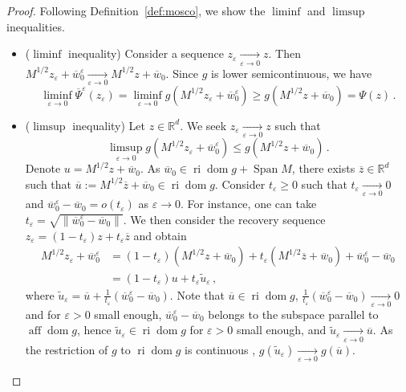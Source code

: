 \documentclass[11pt,english,reqno]{article}
\DeclareMathOperator{\Span}{Span}
\DeclareMathOperator{\dom}{dom}
\DeclareMathOperator{\ri}{ri}
\DeclareMathOperator{\aff}{aff}
\newcommand{\R}{\mathbb{R}}
\renewcommand{\leq}{\leqslant}
\renewcommand{\geq}{\geqslant}
\theoremstyle{plain}
\theoremstyle{definition}
\theoremstyle{remark}
\numberwithin{equation}{section}
\begin{document}
\begin{proof}
	Following Definition~\ref{def:mosco}, we show the $\liminf$ and $\limsup$ inequalities.
	\begin{itemize}
		\item ($\liminf$ inequality) Consider a sequence $z_\varepsilon \xrightarrow[\varepsilon\to 0]{} z$. Then $M^{1/2} z_\varepsilon + \overline{w}_0^\varepsilon \xrightarrow[\varepsilon\to 0]{} M^{1/2} z + \overline{w}_0$. Since $g$ is lower semicontinuous, we have
		\begin{equation*}
			\liminf_{\varepsilon \to 0} \overline{\Psi}^\varepsilon(z_\varepsilon) = \liminf_{\varepsilon \to 0} g(M^{1/2} z_\varepsilon + \overline{w}_0^\varepsilon) \geq g(M^{1/2} z + \overline{w}_0) = \Psi(z) \, .
		\end{equation*}
		\item ($\limsup$ inequality)
		Let $z \in \R^d$. We seek $z_\varepsilon \xrightarrow[\varepsilon\to0]{} z$ such that
		\begin{equation*}
			\limsup_{\varepsilon \to 0} g(M^{1/2} z_\varepsilon + \overline{w}_0^\varepsilon) \leq g(M^{1/2} z + \overline{w}_0) \, .
		\end{equation*}
		Denote $u = M^{1/2} z + \overline{w}_0$. As $\overline{w}_0 \in \ri \dom g + \Span M$, there exists $\overline{z} \in \R^d$ such that $\overline{u} := M^{1/2} \overline{z} + \overline{w}_0 \in \ri \dom g$. Consider $t_\varepsilon \geq 0$ such that $t_\varepsilon \xrightarrow[\varepsilon\to 0]{} 0$ and $\overline{w}_0^\varepsilon - \overline{w}_0 = o(t_\varepsilon)$ as $\varepsilon \to 0$. For instance, one can take $t_\varepsilon = \sqrt{\|\overline{w}_0^\varepsilon - \overline{w}_0\|}$. We then consider the recovery sequence $z_\varepsilon = (1-t_\varepsilon) z + t_\varepsilon \overline{z}$ and obtain
		\begin{align*}
			M^{1/2} z_\varepsilon + \overline{w}_0^\varepsilon &= (1-t_\varepsilon) (M^{1/2} z + \overline{w}_0) + t_\varepsilon (M^{1/2} \overline{z} + \overline{w}_0) + \overline{w}_0^\varepsilon - \overline{w}_0 \\
			&= (1-t_\varepsilon) u + t_\varepsilon \widetilde{u}_\varepsilon \, ,
		\end{align*} 
		where $\widetilde{u}_\varepsilon = \overline{u} + \frac{1}{t_\varepsilon}(\overline{w}_0^\varepsilon - \overline{w}_0)$. 
		Note that $\overline{u} \in \ri \dom g$, $\frac{1}{t_\varepsilon} (\overline{w}_0^\varepsilon - \overline{w}_0) \xrightarrow[\varepsilon\to 0]{} 0$ and for $\varepsilon > 0$ small enough, $\overline{w}_0^\varepsilon - \overline{w}_0$ belongs to the subspace parallel to $\aff \dom g$, hence $\widetilde{u}_\varepsilon \in \ri \dom g$ for $\varepsilon > 0$ small enough, and $\widetilde{u}_\varepsilon \xrightarrow[\varepsilon\to 0]{} \overline{u}$. As the restriction of $g$ to $\ri \dom g$ is continuous \cite[Thm.~10.1]{rockafellar1970convex}, $g(\widetilde{u}_\varepsilon) \xrightarrow[\varepsilon\to 0]{} g(\overline{u})$. 


\end{itemize}
\end{proof}
\end{document}
